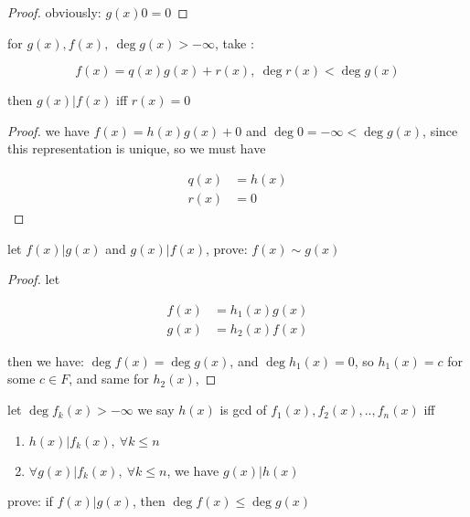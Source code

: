 \begin{proof}
    obviously: $g(x) 0 = 0$
\end{proof}

\begin{exercise}
    for $g(x),f(x),\: \deg g(x) > -\infty$, take :

    \[
        f(x) = q(x)g(x) + r(x),\: \deg r(x) < \deg g(x)
    \]

    then $g(x) | f(x)$ iff $r(x) = 0$
\end{exercise}

\begin{proof}
    we have $f(x)= h(x)g(x) + 0$ and $\deg 0 = -\infty < \deg g(x)$, since this representation is unique, so we must have

    \begin{align*}
        q(x) &= h(x) \\
        r(x) &= 0 
    \end{align*}
\end{proof}

\begin{exercise}
    let $f(x) | g(x)$ and $g(x) | f(x)$, prove: $f(x) \sim g(x)$
\end{exercise}

\begin{proof}
    let

    \begin{align*}
        f(x) &= h_1(x)g(x) \\
        g(x) &= h_2(x)f(x) 
    \end{align*}

    then we have: $\deg f(x) = \deg g(x)$, and $\deg h_1(x) = 0$, so $h_1(x) = c$ for some $c \in F$, and same for $h_2(x)$,

\end{proof}

\begin{definition}
    let $\deg f_k(x) > -\infty$ we say $h(x)$ is gcd of $f_1(x), f_2(x),..,f_n(x)$ iff 

    \begin{enumerate}
        \item $h(x) | f_k(x),\: \forall k \le n$

        \item $\forall g(x) | f_k(x),\: \forall k \le n$, we have $g(x) | h(x)$
    \end{enumerate}
\end{definition}

\begin{exercise}
    prove: if $f(x) | g(x)$, then $\deg f(x) \le \deg g(x)$
\end{exercise}

